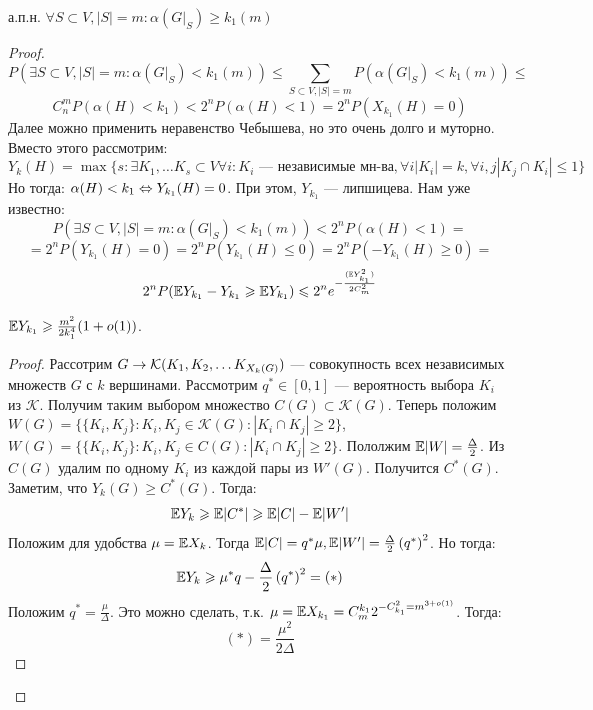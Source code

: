     \begin{lemma}
        а.п.н. \(\forall S \subset V, |S| = m: \alpha\left( G|_S \right) \ge k_1(m)\)
    \end{lemma}
    \begin{proof}
        \[P\left(\exists S \subset V, |S| = m: \alpha\left(G|_S\right) < k_1(m)\right) \le \sum_{S \subset V, |S| = m} P(\alpha\left( G|_S \right) < k_1(m)) \le \]
        \[C_n^m P(\alpha(H) < k_1) < 2^nP(\alpha(H) < 1) = 2^nP(X_{k_1}(H) = 0)\]
        Далее можно применить неравенство Чебышева, но это очень долго и муторно. Вместо этого рассмотрим:
        \[Y_k(H) = \max\{s: \exists K_1, \dots K_s \subset V \forall i: K_i \text{ --- независимые мн-ва}, \forall i |K_i| = k, \forall i, j |K_j \cap K_i| \le 1\}\]
        Но тогда: \(\alpha(H) < k_1 \Leftrightarrow Y_{k_1}(H) = 0\). При этом, \(Y_{k_1}\) --- липшицева.
        Нам уже известно:
        \[P\left(\exists S \subset V, |S| = m: \alpha\left(G|_S\right) < k_1(m)\right) < 2^nP(\alpha(H) < 1)= \]
        \[= 2^nP(Y_{k_1}(H) = 0) = 2^nP(Y_{k_1}(H) \le 0) = 2^nP(-Y_{k_1}(H) \ge 0) = \]
        \[2^nP(\mathbb{E} Y_{k_1} - Y_{k_1} \geqslant \mathbb{E} Y_{k_1}) \leqslant 2^n e^{-\frac{(\mathbb{E} Y_{k_1}^2)}{2C_m^2}}\]

        \begin{lemma}
            \(\mathbb{E} Y_{k_1} \geqslant \frac{m^2}{2k_1^4}(1 + o(1))\).
        \end{lemma}
        \begin{proof}
            Рассотрим \(G \rightarrow \mathcal{K}(K_1, K_2, \dots K_{X_k(G)})\) --- совокупность всех независимых множеств \(G\) с \(k\) вершинами. Рассмотрим \(q^* \in [0, 1]\) --- вероятность выбора \(K_i\) из \(\mathcal{K}\). Получим таким выбором множество \(C(G) \subset \mathcal{K}(G)\). Теперь положим \(W(G) = \{\{K_i, K_j\}: K_i, K_j \in \mathcal{K}(G): |K_i \cap K_j| \ge 2\}\), \(W(G) = \{\{K_i, K_j\}: K_i, K_j \in C(G): |K_i \cap K_j| \ge 2\}\). Пололжим \(\mathbb{E} |W| = \frac{\Delta}{2}\). Из \(C(G)\) удалим по одному \(K_i\) из каждой пары из \(W'(G)\). Получится \(C^*(G)\). Заметим, что \(Y_k(G) \ge C^*(G)\). Тогда:
            \[\mathbb{E} Y_k \geqslant \mathbb{E} |C^*| \geqslant \mathbb{E} |C| - \mathbb{E} |W'|\]
            Положим для удобства \(\mu = \mathbb{E} X_k\). Тогда \(\mathbb{E} |C| = q^*\mu, \mathbb{E} |W'| = \frac{\Delta}{2}\left( q^* \right)^2\). Но тогда:
            \[\mathbb{E} Y_k \geqslant \mu^*q - \frac{\Delta}{2}\left( q^* \right)^2 = (*)\]
            Положим \(q^* = \frac{\mu}{\Delta}\). Это можно сделать, т.к. \(\mu = \mathbb{E} X_{k_1} = C_m^{k_1}2^{-C_{k_1}^2 = m^{3 + o(1)}}\). Тогда:
            \[(*) = \frac{\mu^2}{2\Delta}\]


\end{proof}
\end{proof}

